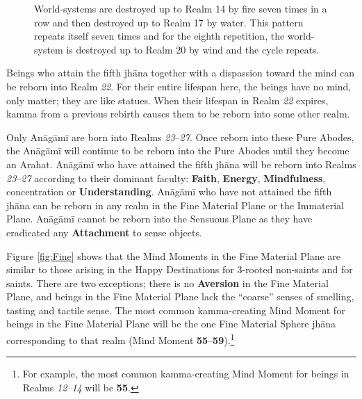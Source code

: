 \begin{figure}[H]
\centering

\caption{World-systems are destroyed up to Realm 14 by fire seven times in a row and then destroyed up to Realm 17 by water. This pattern repeats itself seven times and for the eighth repetition, the world-system is destroyed up to Realm 20 by wind and the cycle repeats.}
\label{fig:Worlds}
\end{figure}

Beings who attain the fifth jhāna together with a dispassion toward the mind can be reborn into Realm \textit{22}. For their entire lifespan here, the beings have no mind, only matter; they are like statues. When their lifespan in Realm \textit{22} expires, kamma from a previous rebirth causes them to be reborn into some other realm.

Only Anāgāmī are born into Realms \textit{23}--\textit{27}. Once reborn into these Pure Abodes, the Anāgāmī will continue to be reborn into the Pure Abodes until they become an Arahat. Anāgāmī who have attained the fifth jhāna will be reborn into Realms \textit{23}--\textit{27} according to their dominant faculty: \textbf{Faith}, \textbf{Energy}, \textbf{Mindfulness}, concentration or \textbf{Understanding}. Anāgāmī who have not attained the fifth jhāna can be reborn in any realm in the Fine Material Plane or the Immaterial Plane. Anāgāmī cannot be reborn into the Sensuous Plane as they have eradicated any \textbf{Attachment} to sense objects.

Figure \ref{fig:Fine} shows that the Mind Moments in the Fine Material Plane are similar to those arising in the Happy Destinations for 3-rooted non-saints and for saints. There are two exceptions; there is no \textbf{Aversion} in the Fine Material Plane, and beings in the Fine Material Plane lack the “coarse” senses of smelling, tasting and tactile sense. The most common kamma-creating Mind Moment for beings in the Fine Material Plane will be the one Fine Material Sphere jhāna corresponding to that realm (Mind Moment \textbf{55}--\textbf{59}).\footnote{For example, the most common kamma-creating Mind Moment for beings in Realms \textit{12}--\textit{14} will be \textbf{55}.}

\pagebreak

